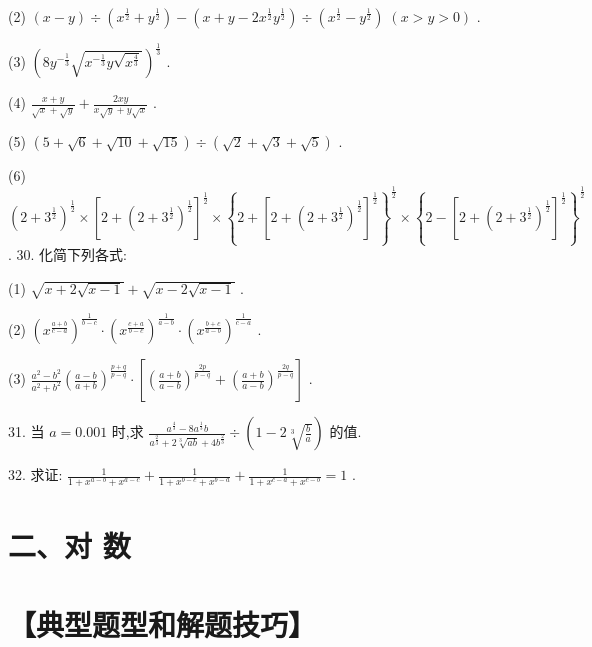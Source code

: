 \documentclass[10pt]{article}
\begin{document}
(2) \(\left( {x - y}\right)  \div  \left( {{x}^{\frac{1}{2}} + {y}^{\frac{1}{2}}}\right)  - \left( {x + y - 2{x}^{\frac{1}{2}}{y}^{\frac{1}{2}}}\right)  \div  \left( {{x}^{\frac{1}{2}} - {y}^{\frac{1}{2}}}\right) \;\left( {x > y > 0}\right)\) .

(3) \({\left( 8{y}^{-\frac{1}{3}}\sqrt{{x}^{-\frac{1}{3}}y\sqrt{{x}^{\frac{4}{3}}}}\right) }^{\frac{1}{3}}\) .

(4) \(\frac{x + y}{\sqrt{x} + \sqrt{y}} + \frac{2xy}{x\sqrt{y} + y\sqrt{x}}\) .

(5) \(\left( {5 + \sqrt{6} + \sqrt{10} + \sqrt{15}}\right)  \div  \left( {\sqrt{2} + \sqrt{3} + \sqrt{5}}\right)\) .

(6) \({\left( 2 + {3}^{\frac{1}{2}}\right) }^{\frac{1}{2}} \times  {\left\lbrack  2 + {\left( 2 + {3}^{\frac{1}{2}}\right) }^{\frac{1}{2}}\right\rbrack  }^{\frac{1}{2}} \times  {\left\{  2 + {\left\lbrack  2 + {\left( 2 + {3}^{\frac{1}{2}}\right) }^{\frac{1}{2}}\right\rbrack  }^{\frac{1}{2}}\right\}  }^{\frac{1}{2}} \times  {\left\{  2 - {\left\lbrack  2 + {\left( 2 + {3}^{\frac{1}{2}}\right) }^{\frac{1}{2}}\right\rbrack  }^{\frac{1}{2}}\right\}  }^{\frac{1}{2}}\) . 30. 化简下列各式:

(1) \(\sqrt{x + 2\sqrt{x - 1}} + \sqrt{x - 2\sqrt{x - 1}}\) .

(2) \({\left( {x}^{\frac{a + b}{c - a}}\right) }^{\frac{1}{b - c}} \cdot  {\left( {x}^{\frac{c + a}{b - c}}\right) }^{\frac{1}{a - b}} \cdot  {\left( {x}^{\frac{b + c}{a - b}}\right) }^{\frac{1}{c - a}}\) .

(3) \(\frac{{a}^{2} - {b}^{2}}{{a}^{2} + {b}^{2}}{\left( \frac{a - b}{a + b}\right) }^{\frac{p + q}{p - q}} \cdot  \left\lbrack  {{\left( \frac{a + b}{a - b}\right) }^{\frac{2p}{p - q}} + {\left( \frac{a + b}{a - b}\right) }^{\frac{2q}{p - q}}}\right\rbrack\) .

31. 当 \(a = {0.001}\) 时,求 \(\frac{{a}^{\frac{4}{3}} - 8{a}^{\frac{1}{3}}b}{{a}^{\frac{2}{3}} + 2\sqrt[3]{ab} + 4{b}^{\frac{2}{3}}} \div  \left( {1 - 2\sqrt[3]{\frac{b}{a}}}\right)\) 的值.

32. 求证: \(\frac{1}{1 + {x}^{a - b} + {x}^{a - c}} + \frac{1}{1 + {x}^{b - c} + {x}^{b - a}} + \frac{1}{1 + {x}^{c - a} + {x}^{c - b}} = 1\) .

\section*{二、对 数}

\section*{【典型题型和解题技巧】}
\end{document}
